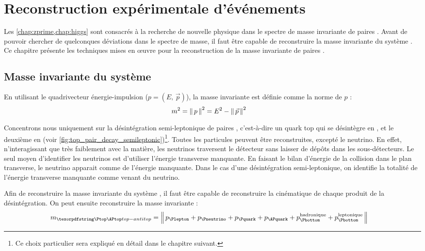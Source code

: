 \chapter{Reconstruction expérimentale d'événements \ttbar} \label{chap:mtt_reco}

Les \cref{chap:zprime,chap:higgs} sont consacrés à la recherche de nouvelle physique dans le spectre de masse invariante de paires \ttbar. Avant de pouvoir chercher de quelconques déviations dans le spectre de masse, il faut être capable de reconstruire la masse invariante du système \ttbar. Ce chapitre présente les techniques mises en œuvre pour la reconstruction de la masse invariante de paires \ttbar.

\section{Masse invariante du système \ttbar}

En utilisant le quadrivecteur énergie-impulsion ($p = \left(E,\,\vec{p}\right)$), la masse invariante est définie comme la norme de $p$ :
\begin{align*}
  m^2 &= \left\lVert \, p \, \right\rVert^2 = E^2 - \left\lVert \, \vec{p} \, \right\rVert^2
\end{align*}

Concentrons nous uniquement sur la désintégration semi-leptonique de paires \ttbar, c'est-à-dire un quark top qui se désintègre en \Plepton{}\Pneutrino{}\Pbottom, et le deuxième en \Pbottom{}\Pquark{}\APquark (voir \cref{fig:top_pair_decay_semileptonic})\footnote{Ce choix particulier sera expliqué en détail dans le chapitre suivant.}. Toutes les particules peuvent être reconstruites, excepté le neutrino. En effet, n'interagissant que très faiblement avec la matière, les neutrinos traversent le détecteur sans laisser de dépôts dans les sous-détecteurs. Le seul moyen d'identifier les neutrinos est d'utiliser l'énergie transverse manquante. En faisant le bilan d'énergie de la collision dans le plan transverse, le neutrino apparait comme de l'énergie manquante. Dans le cas d'une désintégration \ttbar semi-leptonique, on identifie la totalité de l'énergie transverse manquante comme venant du neutrino.

Afin de reconstruire la masse invariante du système \ttbar, il faut être capable de reconstruire la cinématique de chaque produit de la désintégration. On peut ensuite reconstruire la masse invariante \ttbar :
\begin{align} \label{eq:invariant_mass_tt}
  m_{\ttbar} &= \norm{ p_{\Plepton} + p_{\Pneutrino} + p_{\Pquark} + p_{\APquark} + p_{\Pbottom}^{\text{hadronique}} + p_{\Pbottom}^\text{leptonique} }
\end{align}

